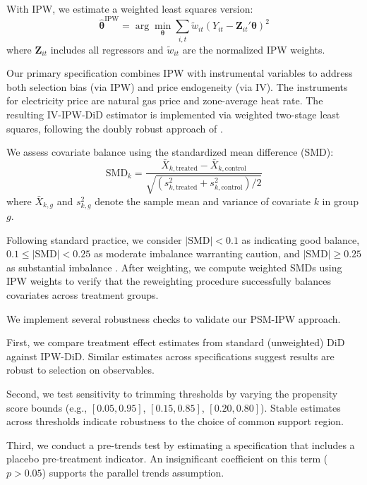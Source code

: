 \documentclass[sigconf]{acmart}
\begin{document}
With IPW, we estimate a weighted least squares version:
\begin{equation}
    \hat{\boldsymbol{\theta}}^{\text{IPW}} = \arg\min_{\boldsymbol{\theta}} \sum_{i,t} \tilde{w}_{it} \left(Y_{it} - \mathbf{Z}_{it}'\boldsymbol{\theta}\right)^2
\end{equation}
where $\mathbf{Z}_{it}$ includes all regressors and $\tilde{w}_{it}$ are the normalized IPW weights.

Our primary specification combines IPW with instrumental variables to address both selection bias (via IPW) and price endogeneity (via IV). The instruments for electricity price are natural gas price and zone-average heat rate. The resulting IV-IPW-DiD estimator is implemented via weighted two-stage least squares, following the doubly robust approach of \citet{santanna2020doubly}.

We assess covariate balance using the standardized mean difference (SMD):
\begin{equation}
    \text{SMD}_k = \frac{\bar{X}_{k,\text{treated}} - \bar{X}_{k,\text{control}}}{\sqrt{(s^2_{k,\text{treated}} + s^2_{k,\text{control}})/2}}
\end{equation}
where $\bar{X}_{k,g}$ and $s^2_{k,g}$ denote the sample mean and variance of covariate $k$ in group $g$.

Following standard practice, we consider $|\text{SMD}| < 0.1$ as indicating good balance, $0.1 \leq |\text{SMD}| < 0.25$ as moderate imbalance warranting caution, and $|\text{SMD}| \geq 0.25$ as substantial imbalance \citep{austin2011introduction}. After weighting, we compute weighted SMDs using IPW weights to verify that the reweighting procedure successfully balances covariates across treatment groups.

We implement several robustness checks to validate our PSM-IPW approach.

First, we compare treatment effect estimates from standard (unweighted) DiD against IPW-DiD. Similar estimates across specifications suggest results are robust to selection on observables.

Second, we test sensitivity to trimming thresholds by varying the propensity score bounds (e.g., $[0.05, 0.95]$, $[0.15, 0.85]$, $[0.20, 0.80]$). Stable estimates across thresholds indicate robustness to the choice of common support region.

Third, we conduct a pre-trends test by estimating a specification that includes a placebo pre-treatment indicator. An insignificant coefficient on this term ($p > 0.05$) supports the parallel trends assumption.
\end{document}
